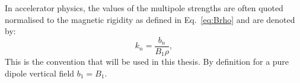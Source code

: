 
In accelerator physics, the values of the multipole strengths are often quoted normalised to the magnetic rigidity as defined in Eq.~\eqref{eq:Brho} and are denoted by:
\begin{equation}\label{eq:kn}
    k_n = \frac{b_n}{B_1 \rho},
\end{equation}
This is the convention that will be used in this thesis. %
By definition for a pure dipole vertical field $b_1=B_1$.%




